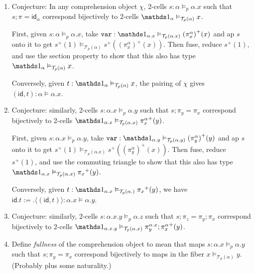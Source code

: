 \documentclass[10pt]{article}
\theoremstyle{definition}
\newcommand{\id}{\mathsf{id}}
\newcommand\TrPlus[2]{\ensuremath{{#1}^+(#2)}}
\newcommand\El[2]{\mathcal{T}_{#1}(#2)}
\newcommand\ap[2]{\ensuremath{#1 \langle #2 \rangle }}
\begin{document}
\begin{enumerate}

\item \label{sigma:total-to-fiber0} Conjecture: In any comprehension
  object $\chi$, 2-cells $s : \alpha \vDash_p \alpha.x$ such that $s;\pi
  = \id_\alpha$ correspond bijectively to 2-cells $\One_\alpha
  \vDash_{\El{p}{\alpha}} x$.

  First, given $s : \alpha \vDash_p \alpha.x$, take $\mtt{var} : \One_{\alpha.x}
  \vDash_{\El{p}{\alpha.x}} \TrPlus{(\pi^\alpha_x)}{x}$ and ap $s$ onto
  it to get $\TrPlus{s}{1} \vDash_{\El{p}{\alpha}}
  \TrPlus{s}{\TrPlus{(\pi^\alpha_x)}{x}}$.  Then fuse, reduce
  $\TrPlus{s}{1}$, and use the section property to show that this also
  has type
  $\One_\alpha \vDash_{\El{p}{\alpha}} x$.

  Conversely, given $t : \One_\alpha \vDash_{\El{p}{\alpha}} x$,
  the pairing of $\chi$ gives $(\id, t) : \alpha \vDash \alpha.x$.

\item \label{sigma:total-to-fiber1} Conjecture: similarly, 2-cells $s :
  \alpha.x \vDash_p \alpha.y$ such that $s;\pi_y = \pi_x$ correspond
  bijectively to 2-cells $\One_{\alpha.x} \vDash_{\El{p}{\alpha.x}}
  \TrPlus{\pi^\alpha_x}{y}$.

  First, given $s : \alpha.x \vDash_p \alpha.y$, take $\mtt{var} :
  \One_{\alpha.y} \vDash_{\El{p}{\alpha.y}} \TrPlus{(\pi^\alpha_y)}{y}$ and
  ap $s$ onto it to get $\TrPlus{s}{1} \vDash_{\El{p}{\alpha.x}}
  \TrPlus{s}{\TrPlus{(\pi^\alpha_y)}{x}}$.  Then fuse, reduce
  $\TrPlus{s}{1}$, and use the commuting triangle to show that this also
  has type $\One_{\alpha.x} \vDash_{\El{p}{\alpha.x}} \TrPlus{\pi_x} y$.

  Conversely, given $t : \One_{\alpha.x} \vDash_{\El{p}{\alpha.}}
  \TrPlus{\pi_x} y$, we have $\id.t := \ap{.}{(\id, t)} : \alpha.x \vDash \alpha.y$.

\item \label{sigma:total-to-fiber2} Conjecture: similarly, 2-cells $s :
  \alpha.x.y \vDash_p \alpha.z$ such that $s;\pi_z = \pi_y;\pi_x$
  correspond bijectively to 2-cells $\One_{\alpha.x.y}
  \vDash_{\El{p}{\alpha.x}} \TrPlus{\pi^{\alpha.x}_y;\pi^\alpha_x}{y}$.

\item \label{sigma:full} Define \emph{fullness} of the comprehension
  object to mean that maps $s : \alpha.x \vDash_p \alpha.y$ such that
  $s;\pi_y = \pi_x$ correspond bijectively to maps in the fiber $x
  \vDash_{\El{p}{\alpha}} y$.  (Probably plus some naturality.)


\end{enumerate}
\end{document}
